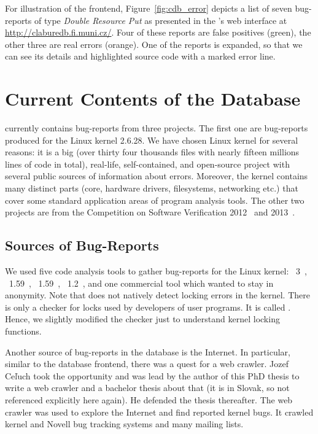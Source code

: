 For illustration of the frontend, Figure~\ref{fig:cdb_error} depicts a list of
seven bug-reports of type \emph{Double Resource Put} as presented in the
\cdb's web interface at \url{http://claburedb.fi.muni.cz/}. Four of these
reports are false positives (green), the other three are real errors (orange).
One of the reports is expanded, so that we can see its details and highlighted
source code with a marked error line.


\section{Current Contents of the Database}\label{sec:cdb_data}

\cdb currently contains bug-reports from three projects. The first one are
bug-reports produced for the Linux kernel 2.6.28. We have chosen Linux kernel
for several reasons: it is a big (over thirty four thousands files with nearly
fifteen millions lines of code in total), real-life, self-contained, and
open-source project with several public sources of information about errors.
Moreover, the kernel contains many distinct parts (core, hardware drivers,
filesystems, networking etc.) that cover some standard application areas of
program analysis tools. The other two projects are from the Competition on
Software Verification 2012~\cite{sv-comp12} and 2013~\cite{sv-comp13}.


\subsection{Sources of Bug-Reports}\label{sec:cdb_sources}

We used five code analysis tools to gather bug-reports for the Linux kernel:
\clang~3~\cite{clang}, \cppcheck~1.59~\cite{cppcheck},
\smatch~1.59~\cite{smatch}, \stan~1.2~\cite{stanse}, and one commercial tool
which wanted to stay in anonymity. Note that \clang does not natively detect
locking errors in the kernel. There is only a checker for locks used by
developers of user programs. It is called
.  Hence, we slightly modified the checker
just to understand kernel locking functions.

Another source of bug-reports in the database is the Internet. In particular,
similar to the database frontend, there was a quest for a web crawler.  Jozef
Ce\v{l}uch took the opportunity and was lead by the author of this PhD thesis
to write a web crawler and a bachelor thesis about that (it is in Slovak, so
not referenced explicitly here again). He defended the thesis thereafter.  The
web crawler was used to explore the Internet and find reported kernel bugs. It
crawled kernel and Novell bug tracking systems and many mailing lists.

